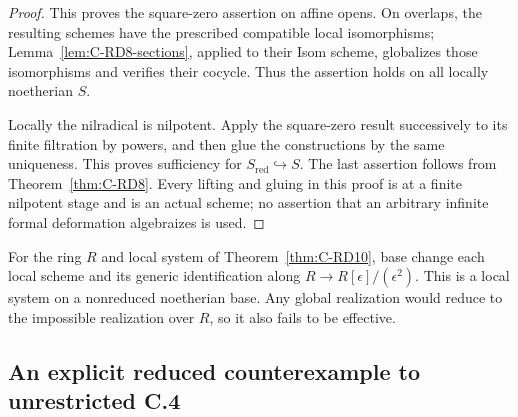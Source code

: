 \begin{proof}
This proves the square-zero assertion on affine opens. On overlaps,
the resulting schemes have the prescribed compatible local
isomorphisms; Lemma~\ref{lem:C-RD8-sections}, applied to their Isom
scheme, globalizes those isomorphisms and verifies their cocycle.
Thus the assertion holds on all locally noetherian $S$.

Locally the nilradical is nilpotent. Apply the square-zero result
successively to its finite filtration by powers, and then glue the
constructions by the same uniqueness. This proves sufficiency for
$S_{\mathrm{red}}\hookrightarrow S$. The last assertion follows
from Theorem~\ref{thm:C-RD8}. Every lifting and gluing in this proof
is at a finite nilpotent stage and is an actual scheme; no assertion
that an arbitrary infinite formal deformation algebraizes is used.
\end{proof}

\begin{remark}\label{auto:C:24b235bcb6c7}

For the ring $R$ and local system of Theorem~\ref{thm:C-RD10}, base
change each local scheme and its generic identification along
$R\to R[\epsilon]/(\epsilon^2)$. This is a local system on a
nonreduced noetherian base. Any global realization would reduce to
the impossible realization over $R$, so it also fails to be effective.
\end{remark}

\subsection{An explicit reduced counterexample to unrestricted C.4}

